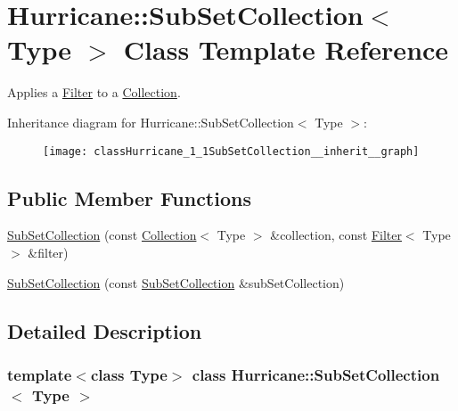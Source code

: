 \hypertarget{classHurricane_1_1SubSetCollection}{}\section{Hurricane\+:\+:Sub\+Set\+Collection$<$ Type $>$ Class Template Reference}
\label{classHurricane_1_1SubSetCollection}


Applies a \mbox{\hyperlink{classHurricane_1_1Filter}{Filter}} to a \mbox{\hyperlink{classHurricane_1_1Collection}{Collection}}.  




Inheritance diagram for Hurricane\+:\+:Sub\+Set\+Collection$<$ Type $>$\+:\nopagebreak
\begin{figure}[H]
\begin{center}
\leavevmode
\texttt{[image: classHurricane\_1\_1SubSetCollection\_\_inherit\_\_graph]}
\end{center}
\end{figure}
\subsection*{Public Member Functions}
\begin{DoxyCompactItemize}
\item 
\mbox{\hyperlink{classHurricane_1_1SubSetCollection_a6da1f511e27351cdc8b56bda7fbc44e8}{Sub\+Set\+Collection}} (const \mbox{\hyperlink{classHurricane_1_1Collection}{Collection}}$<$ Type $>$ \&collection, const \mbox{\hyperlink{classHurricane_1_1Filter}{Filter}}$<$ Type $>$ \&filter)
\item 
\mbox{\hyperlink{classHurricane_1_1SubSetCollection_ad4e0bd9554d898f3991585758dbf2aac}{Sub\+Set\+Collection}} (const \mbox{\hyperlink{classHurricane_1_1SubSetCollection}{Sub\+Set\+Collection}} \&sub\+Set\+Collection)
\end{DoxyCompactItemize}


\subsection{Detailed Description}
\subsubsection*{template$<$class Type$>$\newline
class Hurricane\+::\+Sub\+Set\+Collection$<$ Type $>$}

